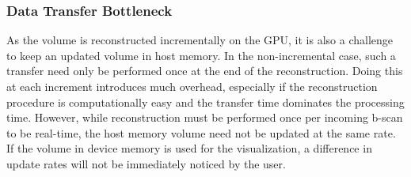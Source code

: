 	\subsubsection{Data Transfer Bottleneck}
	
	As the volume is reconstructed incrementally on the GPU, it is also a challenge to keep an updated volume in host memory. In the non-incremental case, such a transfer need only be performed once at the end of the reconstruction. Doing this at each increment introduces much overhead, especially if the reconstruction procedure is computationally easy and the transfer time dominates the processing time. However, while reconstruction must be performed once per incoming b-scan to be real-time, the host memory volume need not be updated at the same rate. If the volume in device memory is used for the visualization, a difference in update rates will not be immediately noticed by the user.